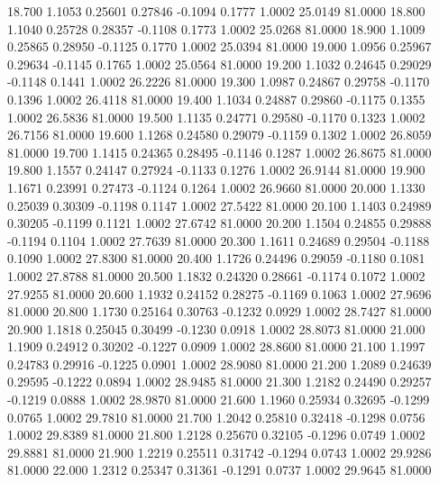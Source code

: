   18.700   1.1053   0.25601   0.27846  -0.1094   0.1777   1.0002  25.0149  81.0000
  18.800   1.1040   0.25728   0.28357  -0.1108   0.1773   1.0002  25.0268  81.0000
  18.900   1.1009   0.25865   0.28950  -0.1125   0.1770   1.0002  25.0394  81.0000
  19.000   1.0956   0.25967   0.29634  -0.1145   0.1765   1.0002  25.0564  81.0000
  19.200   1.1032   0.24645   0.29029  -0.1148   0.1441   1.0002  26.2226  81.0000
  19.300   1.0987   0.24867   0.29758  -0.1170   0.1396   1.0002  26.4118  81.0000
  19.400   1.1034   0.24887   0.29860  -0.1175   0.1355   1.0002  26.5836  81.0000
  19.500   1.1135   0.24771   0.29580  -0.1170   0.1323   1.0002  26.7156  81.0000
  19.600   1.1268   0.24580   0.29079  -0.1159   0.1302   1.0002  26.8059  81.0000
  19.700   1.1415   0.24365   0.28495  -0.1146   0.1287   1.0002  26.8675  81.0000
  19.800   1.1557   0.24147   0.27924  -0.1133   0.1276   1.0002  26.9144  81.0000
  19.900   1.1671   0.23991   0.27473  -0.1124   0.1264   1.0002  26.9660  81.0000
  20.000   1.1330   0.25039   0.30309  -0.1198   0.1147   1.0002  27.5422  81.0000
  20.100   1.1403   0.24989   0.30205  -0.1199   0.1121   1.0002  27.6742  81.0000
  20.200   1.1504   0.24855   0.29888  -0.1194   0.1104   1.0002  27.7639  81.0000
  20.300   1.1611   0.24689   0.29504  -0.1188   0.1090   1.0002  27.8300  81.0000
  20.400   1.1726   0.24496   0.29059  -0.1180   0.1081   1.0002  27.8788  81.0000
  20.500   1.1832   0.24320   0.28661  -0.1174   0.1072   1.0002  27.9255  81.0000
  20.600   1.1932   0.24152   0.28275  -0.1169   0.1063   1.0002  27.9696  81.0000
  20.800   1.1730   0.25164   0.30763  -0.1232   0.0929   1.0002  28.7427  81.0000
  20.900   1.1818   0.25045   0.30499  -0.1230   0.0918   1.0002  28.8073  81.0000
  21.000   1.1909   0.24912   0.30202  -0.1227   0.0909   1.0002  28.8600  81.0000
  21.100   1.1997   0.24783   0.29916  -0.1225   0.0901   1.0002  28.9080  81.0000
  21.200   1.2089   0.24639   0.29595  -0.1222   0.0894   1.0002  28.9485  81.0000
  21.300   1.2182   0.24490   0.29257  -0.1219   0.0888   1.0002  28.9870  81.0000
  21.600   1.1960   0.25934   0.32695  -0.1299   0.0765   1.0002  29.7810  81.0000
  21.700   1.2042   0.25810   0.32418  -0.1298   0.0756   1.0002  29.8389  81.0000
  21.800   1.2128   0.25670   0.32105  -0.1296   0.0749   1.0002  29.8881  81.0000
  21.900   1.2219   0.25511   0.31742  -0.1294   0.0743   1.0002  29.9286  81.0000
  22.000   1.2312   0.25347   0.31361  -0.1291   0.0737   1.0002  29.9645  81.0000
